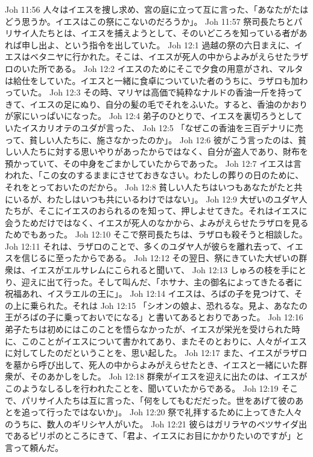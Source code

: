 Joh 11:56  人々はイエスを捜し求め、宮の庭に立って互に言った、「あなたがたはどう思うか。イエスはこの祭にこないのだろうか」。
Joh 11:57  祭司長たちとパリサイ人たちとは、イエスを捕えようとして、そのいどころを知っている者があれば申し出よ、という指令を出していた。
Joh 12:1  過越の祭の六日まえに、イエスはベタニヤに行かれた。そこは、イエスが死人の中からよみがえらせたラザロのいた所である。
Joh 12:2  イエスのためにそこで夕食の用意がされ、マルタは給仕をしていた。イエスと一緒に食卓についていた者のうちに、ラザロも加わっていた。
Joh 12:3  その時、マリヤは高価で純粋なナルドの香油一斤を持ってきて、イエスの足にぬり、自分の髪の毛でそれをふいた。すると、香油のかおりが家にいっぱいになった。
Joh 12:4  弟子のひとりで、イエスを裏切ろうとしていたイスカリオテのユダが言った、
Joh 12:5  「なぜこの香油を三百デナリに売って、貧しい人たちに、施さなかったのか」。
Joh 12:6  彼がこう言ったのは、貧しい人たちに対する思いやりがあったからではなく、自分が盗人であり、財布を預かっていて、その中身をごまかしていたからであった。
Joh 12:7  イエスは言われた、「この女のするままにさせておきなさい。わたしの葬りの日のために、それをとっておいたのだから。
Joh 12:8  貧しい人たちはいつもあなたがたと共にいるが、わたしはいつも共にいるわけではない」。
Joh 12:9  大ぜいのユダヤ人たちが、そこにイエスのおられるのを知って、押しよせてきた。それはイエスに会うためだけではなく、イエスが死人のなかから、よみがえらせたラザロを見るためでもあった。
Joh 12:10  そこで祭司長たちは、ラザロも殺そうと相談した。
Joh 12:11  それは、ラザロのことで、多くのユダヤ人が彼らを離れ去って、イエスを信じるに至ったからである。
Joh 12:12  その翌日、祭にきていた大ぜいの群衆は、イエスがエルサレムにこられると聞いて、
Joh 12:13  しゅろの枝を手にとり、迎えに出て行った。そして叫んだ、「ホサナ、主の御名によってきたる者に祝福あれ、イスラエルの王に」。
Joh 12:14  イエスは、ろばの子を見つけて、その上に乗られた。それは
Joh 12:15  「シオンの娘よ、恐れるな。見よ、あなたの王がろばの子に乗っておいでになる」と書いてあるとおりであった。
Joh 12:16  弟子たちは初めにはこのことを悟らなかったが、イエスが栄光を受けられた時に、このことがイエスについて書かれてあり、またそのとおりに、人々がイエスに対してしたのだということを、思い起した。
Joh 12:17  また、イエスがラザロを墓から呼び出して、死人の中からよみがえらせたとき、イエスと一緒にいた群衆が、そのあかしをした。
Joh 12:18  群衆がイエスを迎えに出たのは、イエスがこのようなしるしを行われたことを、聞いていたからである。
Joh 12:19  そこで、パリサイ人たちは互に言った、「何をしてもむだだった。世をあげて彼のあとを追って行ったではないか」。
Joh 12:20  祭で礼拝するために上ってきた人々のうちに、数人のギリシヤ人がいた。
Joh 12:21  彼らはガリラヤのベツサイダ出であるピリポのところにきて、「君よ、イエスにお目にかかりたいのですが」と言って頼んだ。
